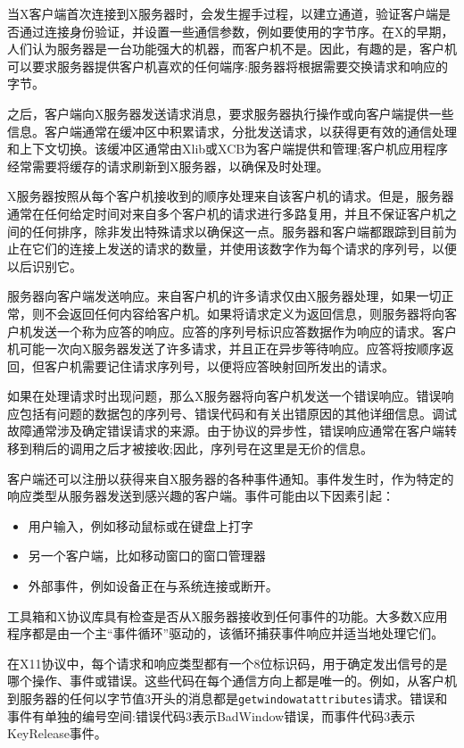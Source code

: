 当X客户端首次连接到X服务器时，会发生握手过程，以建立通道，验证客户端是否通过连接身份验证，并设置一些通信参数，例如要使用的字节序。在X的早期，人们认为服务器是一台功能强大的机器，而客户机不是。因此，有趣的是，客户机可以要求服务器提供客户机喜欢的任何端序:服务器将根据需要交换请求和响应的字节。

之后，客户端向X服务器发送请求消息，要求服务器执行操作或向客户端提供一些信息。客户端通常在缓冲区中积累请求，分批发送请求，以获得更有效的通信处理和上下文切换。该缓冲区通常由Xlib或XCB为客户端提供和管理;客户机应用程序经常需要将缓存的请求刷新到X服务器，以确保及时处理。

X服务器按照从每个客户机接收到的顺序处理来自该客户机的请求。但是，服务器通常在任何给定时间对来自多个客户机的请求进行多路复用，并且不保证客户机之间的任何排序，除非发出特殊请求以确保这一点。服务器和客户端都跟踪到目前为止在它们的连接上发送的请求的数量，并使用该数字作为每个请求的序列号，以便以后识别它。

服务器向客户端发送响应。来自客户机的许多请求仅由X服务器处理，如果一切正常，则不会返回任何内容给客户机。如果将请求定义为返回信息，则服务器将向客户机发送一个称为应答的响应。应答的序列号标识应答数据作为响应的请求。客户机可能一次向X服务器发送了许多请求，并且正在异步等待响应。应答将按顺序返回，但客户机需要记住请求序列号，以便将应答映射回所发出的请求。

如果在处理请求时出现问题，那么X服务器将向客户机发送一个错误响应。错误响应包括有问题的数据包的序列号、错误代码和有关出错原因的其他详细信息。调试故障通常涉及确定错误请求的来源。由于协议的异步性，错误响应通常在客户端转移到稍后的调用之后才被接收;因此，序列号在这里是无价的信息。

客户端还可以注册以获得来自X服务器的各种事件通知。事件发生时，作为特定的响应类型从服务器发送到感兴趣的客户端。事件可能由以下因素引起：


\begin{itemize}
	\item 用户输入，例如移动鼠标或在键盘上打字
	\item 另一个客户端，比如移动窗口的窗口管理器
	\item 外部事件，例如设备正在与系统连接或断开。
\end{itemize}

工具箱和X协议库具有检查是否从X服务器接收到任何事件的功能。大多数X应用程序都是由一个主“事件循环”驱动的，该循环捕获事件响应并适当地处理它们。

在X11协议中，每个请求和响应类型都有一个8位标识码，用于确定发出信号的是哪个操作、事件或错误。这些代码在每个通信方向上都是唯一的。例如，从客户机到服务器的任何以字节值3开头的消息都是\lstinline|getwindowatattributes|请求。错误和事件有单独的编号空间:错误代码3表示BadWindow错误，而事件代码3表示KeyRelease事件。


